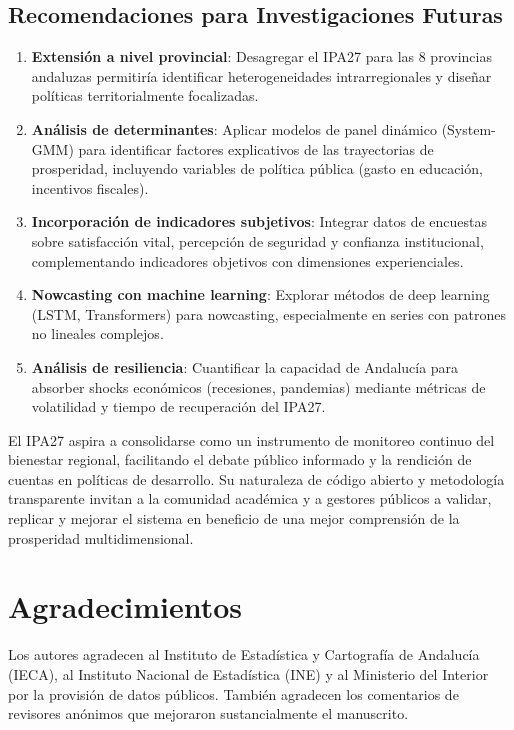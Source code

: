\documentclass[authoryear,12pt]{elsarticle}
\begin{document}
\subsection{Recomendaciones para Investigaciones Futuras}

\begin{enumerate}
    \item \textbf{Extensión a nivel provincial}: Desagregar el IPA27 para las 8 provincias andaluzas permitiría identificar heterogeneidades intrarregionales y diseñar políticas territorialmente focalizadas.

    \item \textbf{Análisis de determinantes}: Aplicar modelos de panel dinámico (System-GMM) para identificar factores explicativos de las trayectorias de prosperidad, incluyendo variables de política pública (gasto en educación, incentivos fiscales).

    \item \textbf{Incorporación de indicadores subjetivos}: Integrar datos de encuestas sobre satisfacción vital, percepción de seguridad y confianza institucional, complementando indicadores objetivos con dimensiones experienciales.

    \item \textbf{Nowcasting con machine learning}: Explorar métodos de deep learning (LSTM, Transformers) para nowcasting, especialmente en series con patrones no lineales complejos.

    \item \textbf{Análisis de resiliencia}: Cuantificar la capacidad de Andalucía para absorber shocks económicos (recesiones, pandemias) mediante métricas de volatilidad y tiempo de recuperación del IPA27.
\end{enumerate}

El IPA27 aspira a consolidarse como un instrumento de monitoreo continuo del bienestar regional, facilitando el debate público informado y la rendición de cuentas en políticas de desarrollo. Su naturaleza de código abierto y metodología transparente invitan a la comunidad académica y a gestores públicos a validar, replicar y mejorar el sistema en beneficio de una mejor comprensión de la prosperidad multidimensional.

\section*{Agradecimientos}

Los autores agradecen al Instituto de Estadística y Cartografía de Andalucía (IECA), al Instituto Nacional de Estadística (INE) y al Ministerio del Interior por la provisión de datos públicos. También agradecen los comentarios de revisores anónimos que mejoraron sustancialmente el manuscrito.
\end{document}
